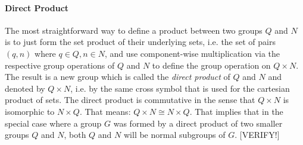 \paragraph{Direct Product}
The most straightforward way to define a product between two groups $Q$ and $N$ is to just form the set product of their underlying sets, i.e. the set of pairs $(q,n)$ where $q \in Q, n \in N$, and use component-wise multiplication via the respective group operations of $Q$ and $N$ to define the group operation on $Q \times N$. The result is a new group which is called the \emph{direct product} of $Q$ and $N$ and denoted by $Q \times N$, i.e. by the same cross symbol that is used for the cartesian product of sets. The direct product is commutative in the sense that $Q \times N$ is isomorphic to $N \times Q$. That means: $Q \times N \cong N \times Q$. That implies that in the special case where a group $G$ was formed by a direct product of two smaller groups $Q$ and $N$, both $Q$ and $N$ will be normal subgroups of $G$. [VERIFY!]






